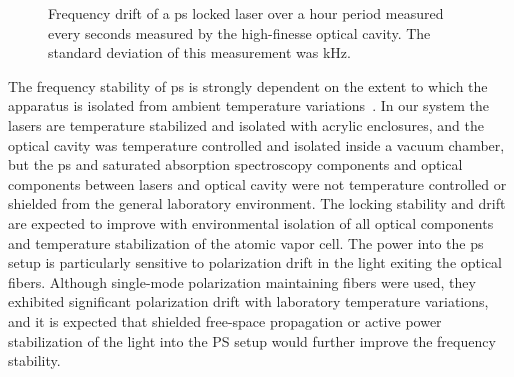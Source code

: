 \begin{figure}
\center

\caption{Frequency drift of a \gls{ps} locked laser over a \unit[60]{hour} period measured every \unit[10]{seconds} measured by the high-finesse optical cavity. The standard deviation of this measurement was \unit[51]{kHz}.}
\label{figure:ps_drift}
\end{figure}

The frequency stability of \gls{ps} is strongly dependent on the extent to which the apparatus is isolated from ambient temperature variations~\cite{yoshikawa_frequency_2003}.
In our system the lasers are temperature stabilized and isolated with acrylic enclosures, and the optical cavity was temperature controlled and isolated inside a vacuum chamber, but the \gls{ps} and saturated absorption spectroscopy components and optical components between lasers and optical cavity were not temperature controlled or shielded from the general laboratory environment.
The locking stability and drift are expected to improve with environmental isolation of all optical components and temperature stabilization of the atomic vapor cell.
The power into the \gls{ps} setup is particularly sensitive to polarization drift in the light exiting the optical fibers.
Although single-mode polarization maintaining fibers were used, they exhibited significant polarization drift with laboratory temperature variations, and it is expected that shielded free-space propagation or active power stabilization of the light into the PS setup would further improve the frequency stability.